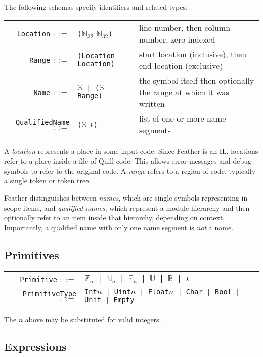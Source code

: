 \documentclass[11pt]{book}
\begin{document}
The following schemas specify identifiers and related types.

\begin{tabular}{r l p{6cm}}
    \lstinline!Location! \( ::= \) & \lstinline!(!\( \mathbb N_{32} \) \( \mathbb N_{32} \)\lstinline!)! & line number, then column number, zero indexed \\
    \lstinline!Range! \( ::= \) & \lstinline!(Location Location)! & start location (inclusive), then end location (exclusive) \\
    \lstinline!Name! \( ::= \) & \( \mathbb S \)\lstinline! | (!\( \mathbb S \)\lstinline! Range)! & the symbol itself then optionally the range at which it was written \\
    \lstinline!QualifiedName! \( ::= \) & \lstinline!(!\( \mathbb S \) \lstinline!+)! & list of one or more name segments
\end{tabular}

A \textit{location} represents a place in some input code.
Since Feather is an IL, locations refer to a place inside a file of Quill code.
This allows error messages and debug symbols to refer to the original code.
A \textit{range} refers to a region of code, typically a single token or token tree.

Feather distinguishes between \textit{names}, which are single symbols representing in-scope items, and \textit{qualified names}, which represent a module hierarchy and then optionally refer to an item inside that hierarchy, depending on context.
Importantly, a qualified name with only one name segment is \textit{not} a name.

\subsection{Primitives}

\begin{tabular}{r l p{7cm}}
    \lstinline!Primitive! \( ::= \) & \( \mathbb Z_{n} \)\lstinline! | !\( \mathbb N_{n} \)\lstinline! | !\( \mathbb F_{n} \)\lstinline! | !\( \mathbb U \)\lstinline! | !\( \mathbb B \)\lstinline! | !\( \star \) \\
    \lstinline!PrimitiveType! \( ::= \) & \lstinline!Int!\( n \)\lstinline! | Uint!\( n \)\lstinline! | Float!\( n \)\lstinline! | Char | Bool | Unit | Empty!
\end{tabular}

The \( n \) above may be substituted for valid integers.

\subsection{Expressions}
\end{document}
